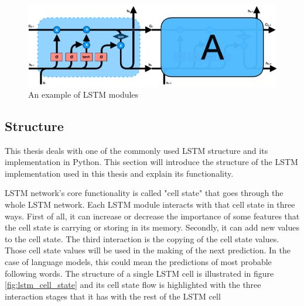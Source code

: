 \begin{figure}[h]
    \centering
    \includegraphics[width=12cm,height=\textheight,keepaspectratio]{lstm_modules}
    \caption{An example of LSTM modules \parencite{Olah2015Understanding}}
    \label{fig:lstm_modules}
\end{figure}

\subsection{Structure}

This thesis deals with one of the commonly used LSTM structure and its implementation in Python. This section will introduce the structure of the LSTM implementation used in this thesis and explain its functionality.

LSTM network's core functionality is called "cell state" that goes through the whole LSTM network. Each LSTM module interacts with that cell state in three ways. First of all, it can increase or decrease the importance of some features that the cell state is carrying or storing in its memory. Secondly, it can add new values to the cell state. The third interaction is the copying of the cell state values. Those cell state values will be used in the making of the next prediction. In the case of language models, this could mean the predictions of most probable following words. The structure of a single LSTM cell is illustrated in figure \ref{fig:lstm_cell_state} and its cell state flow is highlighted with the three interaction stages that it has with the rest of the LSTM cell



